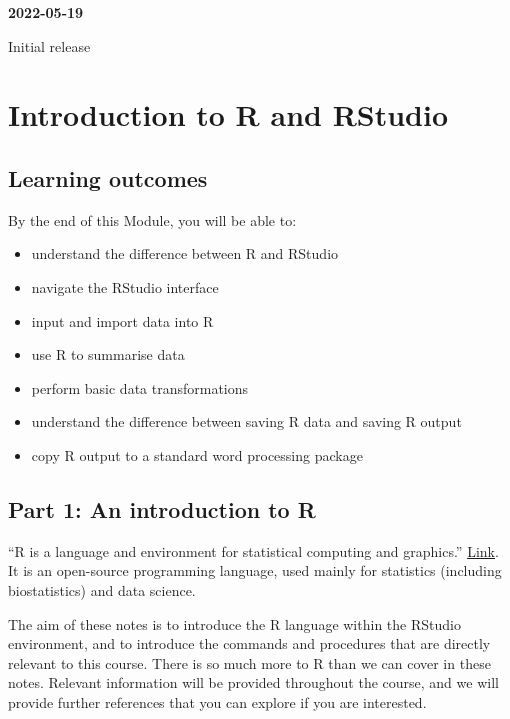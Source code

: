 \documentclass[
]{memoir}
\providecommand{\tightlist}{%
  \setlength{\itemsep}{0pt}\setlength{\parskip}{0pt}}
\begin{document}
\textbf{2022-05-19}

Initial release

\hypertarget{introduction-to-r-and-rstudio}{%
\chapter{Introduction to R and RStudio}\label{introduction-to-r-and-rstudio}}

\hypertarget{learning-outcomes}{%
\section*{Learning outcomes}\label{learning-outcomes}}

By the end of this Module, you will be able to:

\begin{itemize}
\tightlist
\item
  understand the difference between R and RStudio
\item
  navigate the RStudio interface
\item
  input and import data into R
\item
  use R to summarise data
\item
  perform basic data transformations
\item
  understand the difference between saving R data and saving R output
\item
  copy R output to a standard word processing package
\end{itemize}

\hypertarget{part-1-an-introduction-to-r}{%
\section*{Part 1: An introduction to R}\label{part-1-an-introduction-to-r}}

``R is a language and environment for statistical computing and graphics.'' \href{https://www.r-project.org/about.html}{Link}. It is an open-source programming language, used mainly for statistics (including biostatistics) and data science.

The aim of these notes is to introduce the R language within the RStudio environment, and to introduce the commands and procedures that are directly relevant to this course. There is so much more to R than we can cover in these notes. Relevant information will be provided throughout the course, and we will provide further references that you can explore if you are interested.
\end{document}
